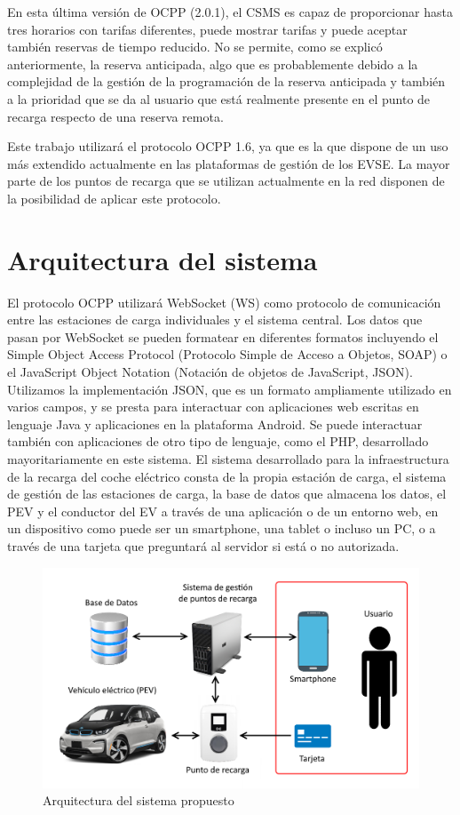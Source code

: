 \documentclass[12pt,a4paper,onecolumn,oneside]{report}
\begin{document}
En esta última versión de OCPP (2.0.1), el CSMS es capaz de proporcionar hasta tres horarios con tarifas diferentes, puede mostrar tarifas y puede aceptar también reservas de tiempo reducido. No se permite, como se explicó anteriormente, la reserva anticipada, algo que es probablemente debido a la complejidad de la gestión de la programación de la reserva anticipada y también a la prioridad que se da al usuario que está realmente presente en el punto de recarga respecto de una reserva remota.

Este trabajo utilizará el protocolo OCPP 1.6, ya que es la que dispone de un uso más extendido actualmente en las plataformas de gestión de los EVSE. La mayor parte de los puntos de recarga que se utilizan actualmente en la red disponen de la posibilidad de aplicar este protocolo.

\chapter{Arquitectura del sistema}
\label{Arquitectura del sistema}

El protocolo OCPP utilizará WebSocket (WS) como protocolo de comunicación entre las estaciones de carga individuales y el sistema central. Los datos que pasan por WebSocket se pueden formatear en diferentes formatos incluyendo el Simple Object Access Protocol (Protocolo Simple de Acceso a Objetos, SOAP) o el JavaScript Object Notation (Notación de objetos de JavaScript, JSON). Utilizamos la implementación JSON, que es un formato ampliamente utilizado en varios campos, y se presta para interactuar con aplicaciones web escritas en lenguaje Java y aplicaciones en la plataforma Android. Se puede interactuar también con aplicaciones de otro tipo de lenguaje, como el PHP, desarrollado mayoritariamente en este sistema. El sistema desarrollado para la infraestructura de la recarga del coche eléctrico consta de la propia estación de carga, el sistema de gestión de las estaciones de carga, la base de datos que almacena los datos, el PEV y el conductor del EV a través de una aplicación o de un entorno web, en un dispositivo como puede ser un smartphone, una tablet o incluso un PC, o a través de una tarjeta que preguntará al servidor si está o no autorizada.


\begin{figure}[h] 
\centering
  \includegraphics[width=.75\textwidth]{figuras/esquema.png}
  \caption[Arquitectura del sistema propuesto]{Arquitectura del sistema propuesto\\
  }
  \label{fig:arquitectura}
\end{figure}
\end{document}
